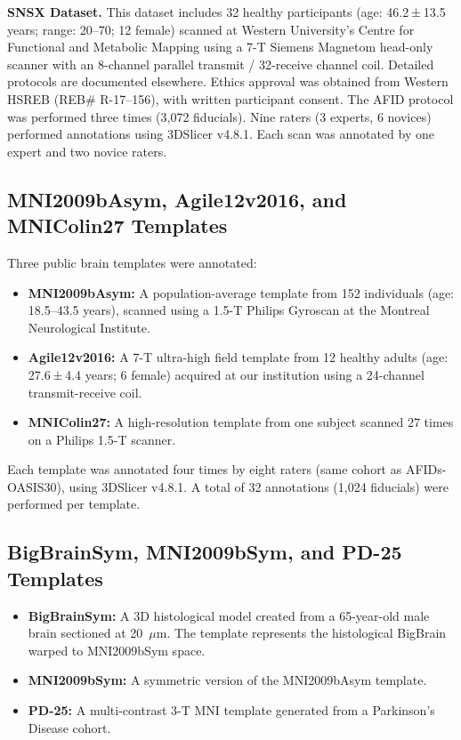 \textbf{SNSX Dataset. }This dataset includes 32 healthy participants (age: 46.2 ± 13.5 years; range: 20–70; 12 female) scanned at Western University's Centre for Functional and Metabolic Mapping using a 7-T Siemens Magnetom head-only scanner with an 8-channel parallel transmit / 32-receive channel coil. Detailed protocols are documented elsewhere\cite{snsx}. Ethics approval was obtained from Western HSREB (REB\# R-17–156), with written participant consent. The AFID protocol was performed three times (3,072 fiducials). Nine raters (3 experts, 6 novices) performed annotations using 3DSlicer v4.8.1. Each scan was annotated by one expert and two novice raters.

\subsection{MNI2009bAsym, Agile12v2016, and MNIColin27 Templates}

Three public brain templates were annotated:
\begin{itemize}
    \item \textbf{MNI2009bAsym:} A population-average template from 152 individuals (age: 18.5–43.5 years), scanned using a 1.5-T Philips Gyroscan at the Montreal Neurological Institute\cite{mni2009}.
    \item \textbf{Agile12v2016:} A 7-T ultra-high field template from 12 healthy adults (age: 27.6 ± 4.4 years; 6 female) acquired at our institution using a 24-channel transmit-receive coil\cite{agile}.
    \item \textbf{MNIColin27:} A high-resolution template from one subject scanned 27 times on a Philips 1.5-T scanner\cite{colin27}.
\end{itemize}

Each template was annotated four times by eight raters (same cohort as AFIDs-OASIS30), using 3DSlicer v4.8.1. A total of 32 annotations (1,024 fiducials) were performed per template.

\subsection{BigBrainSym, MNI2009bSym, and PD-25 Templates}

\begin{itemize}
    \item \textbf{BigBrainSym:} A 3D histological model created from a 65-year-old male brain sectioned at 20~$\mu$m\cite{bigbrain}. The template represents the histological BigBrain warped to MNI2009bSym space.
    \item \textbf{MNI2009bSym:} A symmetric version of the MNI2009bAsym template\cite{mni2009}.
    \item \textbf{PD-25:} A multi-contrast 3-T MNI template generated from a Parkinson's Disease cohort\cite{pd25}.
\end{itemize}

